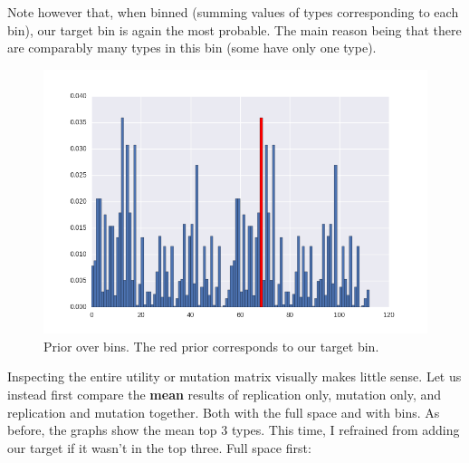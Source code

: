 \documentclass[a4paper]{article}
\begin{document}
Note however that, when binned (summing values of types corresponding to each bin), our target bin is again the most probable. The main reason being that there are comparably many types in this bin (some have only one type).
\begin{figure}[h!]
  \centering
  \includegraphics[scale=.35]{../code-LOT-extension/plots/priors-binned-meFalse432.png} %
  \caption{Prior over bins. The red prior corresponds to our target bin.}
  \label{fig:priors}
\end{figure}


Inspecting the entire utility or mutation matrix visually makes little sense. Let us instead first compare the {\bf mean} results of replication only, mutation only, and replication and mutation together. Both with the full space and with bins. As before, the graphs show the mean top $3$ types. This time, I refrained from adding our target if it wasn't in the top three. Full space first:
\end{document}
